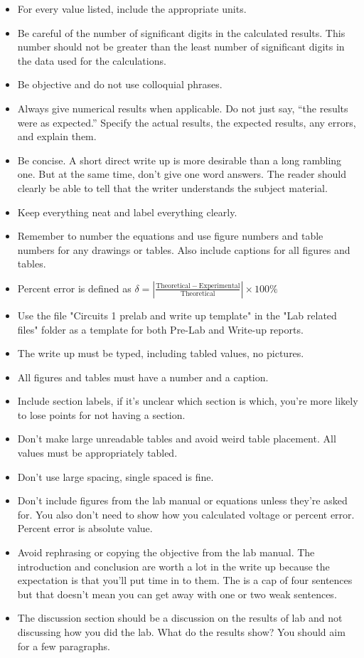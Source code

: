 \begin{itemize}
	\item For every value listed, include the appropriate units. 
	\item Be careful of the number of significant digits in the calculated results. This number should not be greater than the least number of significant digits in the data used for the calculations.
	\item Be objective and do not use colloquial phrases.
	\item Always give numerical results when applicable. Do not just say, ``the results
were as expected.'' Specify the actual results, the expected results, any errors, and explain them.
	\item Be concise. A short direct write up is more desirable than a long rambling one. But at the same time, don't give one word answers. The reader should clearly be able to tell that the writer understands the subject material. 
	\item Keep everything neat and label everything clearly.
	\item Remember to number the equations and use figure numbers and table numbers for any drawings or tables. Also include captions for all figures and tables.
	\item Percent error is defined as $\delta = |\frac{\mathrm{Theoretical - Experimental}}{\mathrm{Theoretical}}| \times \mathrm{100\%}$
	\item Use the file "Circuits 1 prelab and write up template"  in the "Lab related files" folder as a template for both Pre-Lab and Write-up reports.
	\item The write up must be typed, including tabled values, no pictures.
	\item All figures and tables must have a number and a caption.
	\item Include section labels, if it's unclear which section is which, you're more likely to lose points for not having a section.
	\item Don't make large unreadable tables and avoid weird table placement. All values must be appropriately tabled.
	\item Don't use large spacing, single spaced is fine.
	\item Don't include figures from the lab manual or equations unless they're asked for. You also don't need to show how you calculated voltage or percent error. Percent error is absolute value.
	\item Avoid rephrasing or copying the objective from the lab manual. The introduction and conclusion are worth a lot in the write up because the expectation is that you'll put time in to them. The is a cap of four sentences but that doesn't mean you can get away with one or two weak sentences.
	\item The discussion section should be a discussion on the results of lab and not discussing how you did the lab. What do the results show? You should aim for a few paragraphs.
\end{itemize}




